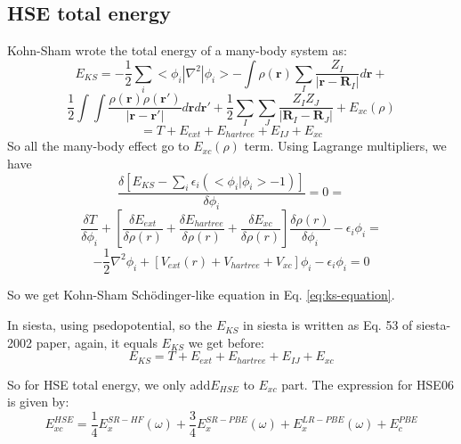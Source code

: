 \documentclass[aps,preprint,12pt]{revtex4-1}
\begin{document}
\subsection{HSE total energy}
Kohn-Sham wrote the total energy of a many-body system as:
\[
E_{KS}=-\dfrac{1}{2}\sum_{i}<\phi_i|\nabla^2|\phi_i>-\int {\rho(\mathbf{r})  \sum_{I}\dfrac{Z_{I}}{|\mathbf{r}-\mathbf{R}_{I}|}  d\mathbf{r}}+
\]
\begin{equation}
 \dfrac{1}{2}\int \int {\dfrac{\rho(\mathbf{r}) \rho(\mathbf{r'}) }{|\mathbf{r}-\mathbf{r'} |}  d\mathbf{r}  d\mathbf{r'}} +\dfrac{1}{2}\sum_{I}\sum_{J}{\dfrac{Z_{I} Z_{J}}{|\mathbf{R}_{I}-\mathbf{R}_{J} |} }+ E_{xc}(\rho)
\label{eq:E_KS}
\end{equation}
\begin{equation}
= T+E_{ext}+E_{hartree}+E_{IJ}+E_{xc}
\end{equation}
So all the many-body effect go to $E_{xc}(\rho)$ term. Using Lagrange multipliers, we have 
\begin{equation}
\dfrac{\delta [E_{KS}-\sum_{i}\epsilon_{i}(<\phi_i|\phi_i> -1)] }
{\delta \phi_i} =  0 =
\end{equation}
\begin{equation}
\dfrac{\delta T}{\delta \phi_i} + 
[\dfrac{\delta E_{ext}}{\delta \rho(r)} + \dfrac{\delta E_{hartree}}{\delta \rho(r)} +  \dfrac{\delta E_{xc}}{\delta \rho(r)} ] 
\dfrac{\delta \rho(r)}{\delta \phi_i}-\epsilon_{i} \phi_i = 
\end{equation}
\begin{equation}
 -\dfrac{1}{2}\nabla^2 \phi_i + 
[V_{ext}(r)+V_{hartree}+V_{xc}] \phi_i -\epsilon_{i} \phi_i = 0
\label{eq:ks-equation}
\end{equation}

So we get Kohn-Sham Sch\"{o}dinger-like equation in Eq. \ref{eq:ks-equation}.

In siesta, using psedopotential, so the $E_{KS}$ in siesta is written as Eq. 53 of siesta-2002 paper, again, it equals $E_{KS}$ we get before:
\begin{equation}
E_{KS}= T + E_{ext}+ E_{hartree} + E_{IJ}+E_{xc} 
\end{equation} 

So for HSE total energy, we only add$ E_{HSE}$ to $E_{xc}$ part. 
The expression for HSE06 is given by: 
\begin{equation}
 E_{xc}^{HSE}=\dfrac{1}{4}E_{x}^{SR-HF}(\omega)+\dfrac{3}{4}E_{x}^{SR-PBE}(\omega)
+E_{x}^{LR-PBE}(\omega)+E_{c}^{PBE}
\end{equation} 
\end{document}
